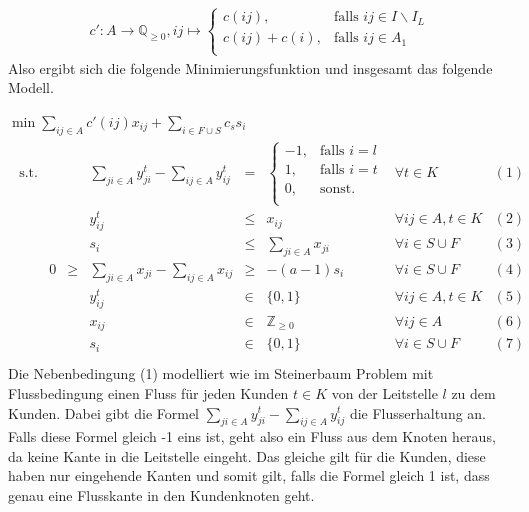 \documentclass[11pt,a4paper]{article}
\newcommand{\Z}{\mathbb{Z}}
\newcommand{\Q}{\mathbb{Q}}
\theoremstyle{my_th_style1}
\begin{document}
\begin{align}
\label{KostenfunktionP2MP}
c': A \rightarrow \Q_{ \geq 0}, ij  \mapsto \left\{\begin{array}{cl} 
c(ij), & \text{falls } ij \in I\backslash I_L\\ 
c(ij)+c(i), & \text{falls } ij \in A_1\\ 
\end{array}
\right.
\end{align}
Also ergibt sich die folgende Minimierungsfunktion und insgesamt das folgende Modell.


 \bigskip
 $\min \displaystyle\sum_{ij \in A} c'(ij) x_{ij} + \displaystyle\sum_{i \in F \cup S} c_s s_i $
 \begin{align}\label{model_p2mpf}
 \begin{array}{rcrcrcll}
 \textrm{s.t.}  
&& &\displaystyle\sum_{ji \in A} y_{ji}^t - \displaystyle\sum_{ij \in A} y_{ij}^t& = & \left\{\begin{array}{cl} 
 -1, & \text{falls } i=l\\ 
 1, & \text{falls } i=t\\ 
 0, & \text{sonst.}\\ 
 \end{array}
 \right. & \forall t \in K & (1) \\
 &&& y_{ij}^t & \leq & x_{ij} & \forall ij \in A, t\in K & (2)\\
 &&& s_i &\leq& \displaystyle\sum_{ji \in A} x_{ji}& \forall  i \in S \cup F& (3)\\ 
 &0&\geq&\displaystyle\sum_{ji \in A} x_{ji} - \displaystyle\sum_{ij \in A} x_{ij}&\geq& -(a-1)s_i & \forall i \in S \cup F& (4)\\
 &&& y_{ij}^t & \in & \{0,1 \}& \forall ij \in A, t \in K & (5)\\
 &&& x_{ij} & \in & \Z _{\geq 0}& \forall ij \in A & (6)\\
 &&& s_i & \in & \{ 0,1 \} & \forall i \in S \cup F & (7) \\
 \end{array}
 \end{align}
Die Nebenbedingung (1) modelliert wie im Steinerbaum Problem mit Flussbedingung einen Fluss für jeden Kunden $t \in K$ von der Leitstelle $l$ zu dem Kunden.
Dabei gibt die Formel $\displaystyle\sum_{ji \in A} y_{ji}^t - \displaystyle\sum_{ij \in A} y_{ij}^t$ die Flusserhaltung an.
Falls diese Formel gleich -1 eins ist, geht also ein Fluss aus dem Knoten heraus, da keine Kante in die Leitstelle eingeht.
Das gleiche gilt für die Kunden, diese haben nur eingehende Kanten und somit gilt, falls die Formel gleich 1 ist, dass genau eine Flusskante in den Kundenknoten geht.
\end{document}
